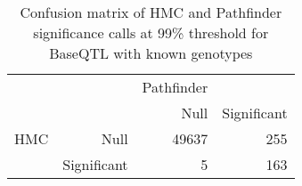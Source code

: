 \begin{table}[ht]
\centering
\caption{Confusion matrix of HMC and Pathfinder significance calls at 99\% threshold for BaseQTL with known genotypes} 
\label{tab:GT-xtab-99-pfp}
\begin{tabular}{rr|rr}
   &  & Pathfinder &  \\ 
    &   & Null & Significant \\ 
   \hline
HMC & Null & 49637 & 255 \\ 
    & Significant & 5 & 163 \\ 
  \end{tabular}
\end{table}
